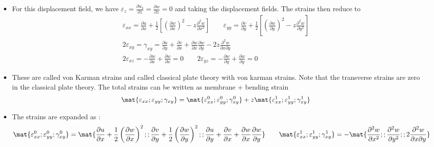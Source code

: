 	\begin{frame}
		\begin{itemize}
			\item  For this displacement field, we have $\varepsilon_{z} = \frac{\partial u_3}{\partial z} = \frac{\partial w}{\partial z} = 0$ and taking the displacement fields. The strains then reduce to
			\begin{equation}
				\begin{aligned}
				\varepsilon_{xx}= \frac{\partial u}{\partial x} + \frac{1}{2}\left[ \left(\frac{\partial w}{\partial x} \right)^2 - z \frac{\partial^2 w}{\partial x^2}\right] \qquad
				\varepsilon_{yy} = \frac{\partial v}{\partial y} + \frac{1}{2}\left[ 
				\left(\frac{\partial w}{\partial y} \right)^2 - z\frac{\partial^2 w}{\partial y^2}\right]\\
				2\varepsilon_{xy} = \gamma_{xy} = \frac{\partial u}{\partial y} + \frac{\partial v}{\partial x} + 
				\frac{\partial w}{\partial x}\frac{\partial w}{\partial y} -2z\frac{\partial^2 w}{\partial x \partial y}	\\
				2\varepsilon_{xz} = -  \frac{\partial w}{\partial x} + \frac{\partial w}{\partial x} = 0\qquad
				2\varepsilon_{yz} = - \frac{\partial w}{\partial y} + \frac{\partial w}{\partial y} = 0
				\end{aligned}
			\end{equation}
			\item These are called von Karman strains and called classical plate theory with von karman strains. Note that the transverse strains are zero in the classical plate theory. The total strains can be written as membrane + bending strain
			\begin{equation}
			\mat{\varepsilon_{xx};\varepsilon_{yy};\gamma_{xy}} =  \mat{\varepsilon_{xx}^0;\varepsilon_{yy}^0;\gamma_{xy}^0} + z\mat{\varepsilon_{xx}^1;\varepsilon_{yy}^1;\gamma_{xy}^1}
			\end{equation}
		\end{itemize}
	\end{frame}


	\begin{frame}
		\begin{itemize}
			\item The strains are expanded as : 
			\begin{equation}
			\begin{aligned}
			\mat{\varepsilon_{xx}^0;\varepsilon_{yy}^0;\gamma_{xy}^0} = 
			\mat{\frac{\partial u}{\partial x} + \frac{1}{2} \left(\frac{\partial w}{\partial x} \right)^2 ; ;
				 \frac{\partial v}{\partial y} + \frac{1}{2}\left(\frac{\partial w}{\partial y} \right)^2; ;
				\frac{\partial u}{\partial y} + \frac{\partial v}{\partial x} + 
				\frac{\partial w}{\partial x}\frac{\partial w}{\partial y} }\qquad
			\mat{\varepsilon_{xx}^1;\varepsilon_{yy}^1;\gamma_{xy}^1} = - \mat{
			\frac{\partial^2 w}{\partial x^2};; \frac{\partial^2 w}{\partial y^2};; 2\frac{\partial^2 w}{\partial x \partial y}	}
			\end{aligned}
			\end{equation}
		\end{itemize}
	\end{frame}


